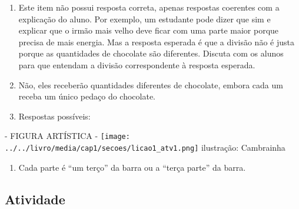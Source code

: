 \documentclass[a4paper,12pt,twoside]{book}
\begin{document}
\begin{resposta*}[breakable]{}{}  
\begin{enumerate} [\quad a)] %
    \item       Este item não possui resposta correta, apenas respostas coerentes com a explicação do aluno. Por exemplo, um estudante pode dizer que sim e explicar que o irmão mais velho deve ficar com uma parte maior porque precisa de mais energia. Mas a resposta esperada é que a divisão não é justa porque as quantidades de chocolate são diferentes. Discuta com os alunos para que entendam a divisão correspondente à resposta esperada.
    \item       Não, eles receberão quantidades diferentes de chocolate, embora cada um receba um único pedaço do chocolate.
    \item       Respostas possíveis:
\end{enumerate} %
  \begin{imagem*}[breakable]{}{}      - FIGURA ARTÍSTICA -    \mbox{} \newline              \texttt{[image: ../../livro/media/cap1/secoes/licao1\_atv1.png]}    \mbox{} \newline      ilustração: Cambrainha   \end{imagem*}  
\begin{enumerate} [\quad a)] %
    \item       Cada parte é       ``um terço''       da barra ou a       ``terça parte''       da barra.
\end{enumerate} %
  
\end{resposta*}






\subsection{Atividade}
\end{document}
